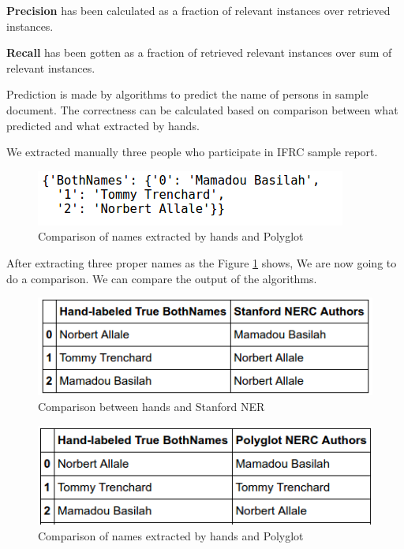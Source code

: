 \textbf{Precision} has been calculated as a  fraction of relevant instances over  retrieved instances.

\textbf{Recall} has been gotten as a fraction of retrieved relevant instances over  sum of relevant instances.

Prediction is made by algorithms to predict the name of persons in sample document. The correctness can be calculated based on comparison between what predicted and what extracted by hands. 

 We extracted manually three people who participate in IFRC sample report.

\begin{figure}[hbtp]
\centering
\includegraphics[scale=.7]{images/BothNames.png}
\caption{Comparison of names extracted by hands and Polyglot}\label{Hand}
\end{figure}

After extracting three proper names as the Figure \ref{Hand} shows,  We are now going to do a comparison. We can compare the output of the algorithms. 

\begin{figure}[hbtp]
\caption{Comparison between hands and Stanford NER}
\centering
\includegraphics[scale=.8]{images/1.png}
\end{figure}


\begin{figure}[hbtp]
\caption{Comparison of names extracted by hands and Polyglot}
\centering
\includegraphics[scale=.8]{images/3.png}
\end{figure}


